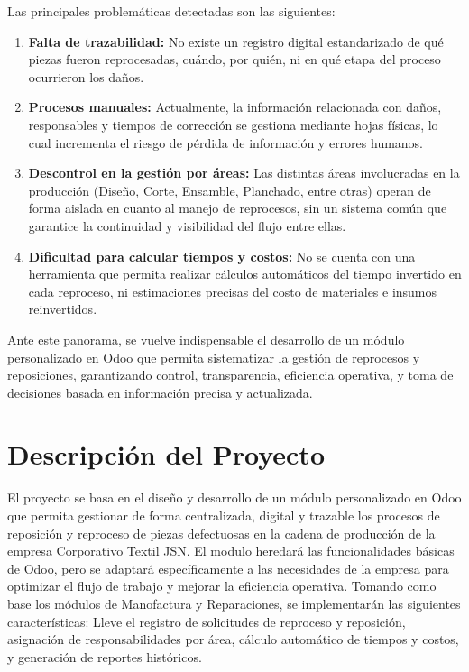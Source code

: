 \documentclass[12pt,letterpaper,spanish]{report}
\begin{document}
Las principales problemáticas detectadas son las siguientes:

\begin{enumerate}
    \item \textbf{Falta de trazabilidad:} No existe un registro digital estandarizado de qué piezas fueron reprocesadas, cuándo, por quién, ni en qué etapa del proceso ocurrieron los daños.
    
    \item \textbf{Procesos manuales:} Actualmente, la información relacionada con daños, responsables y tiempos de corrección se gestiona mediante hojas físicas, lo cual incrementa el riesgo de pérdida de información y errores humanos.
    
    \item \textbf{Descontrol en la gestión por áreas:} Las distintas áreas involucradas en la producción (Diseño, Corte, Ensamble, Planchado, entre otras) operan de forma aislada en cuanto al manejo de reprocesos, sin un sistema común que garantice la continuidad y visibilidad del flujo entre ellas.
    
    \item \textbf{Dificultad para calcular tiempos y costos:} No se cuenta con una herramienta que permita realizar cálculos automáticos del tiempo invertido en cada reproceso, ni estimaciones precisas del costo de materiales e insumos reinvertidos.

\end{enumerate}

Ante este panorama, se vuelve indispensable el desarrollo de un módulo personalizado en Odoo que permita sistematizar la gestión de reprocesos y reposiciones, garantizando control, transparencia, eficiencia operativa, y toma de decisiones basada en información precisa y actualizada.



\section{Descripción del Proyecto}

El proyecto se basa en el diseño y desarrollo de un módulo personalizado en Odoo que permita gestionar de forma centralizada, digital y trazable los procesos de reposición y reproceso de piezas defectuosas en la cadena de producción de la empresa Corporativo Textil JSN. El modulo heredará las funcionalidades básicas de Odoo, pero se adaptará específicamente a las necesidades de la empresa para optimizar el flujo de trabajo y mejorar la eficiencia operativa. Tomando como base los módulos de Manofactura y Reparaciones, se implementarán las siguientes características: Lleve el registro de solicitudes de reproceso y reposición, asignación de responsabilidades por área, cálculo automático de tiempos y costos, y generación de reportes históricos.
\end{document}
